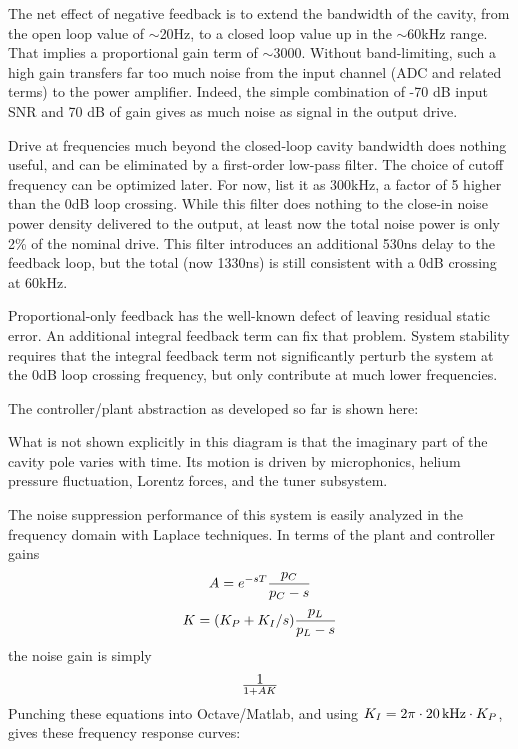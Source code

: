 The net effect of negative feedback is to extend the bandwidth of
the cavity, from the open loop value of $\sim$20\thinspace Hz, to a closed
loop value up in the $\sim$60\thinspace kHz range.  That implies a
proportional gain term of $\sim$3000.  Without band-limiting, such
a high gain transfers far too much noise from the input channel
(ADC and related terms) to the power amplifier.   Indeed, the simple
combination of -70 dB input SNR and 70 dB of gain gives as much noise
as signal in the output drive.

Drive at frequencies much beyond the closed-loop cavity bandwidth does
nothing useful, and can be eliminated by a first-order low-pass filter.
The choice of cutoff frequency can be optimized later.
For now, list it as 300\thinspace kHz, a factor of 5 higher
than the 0\thinspace dB loop crossing.  While this filter does nothing
to the close-in noise power density delivered to the output, at least
now the total noise power is only 2\% of the nominal drive.
This filter introduces an additional 530\thinspace ns delay to the
feedback loop, but the total (now 1330\thinspace ns) is still
consistent with a 0\thinspace dB crossing at 60\thinspace kHz.

Proportional-only feedback has the well-known defect of leaving
residual static error.  An additional integral feedback term can
fix that problem.  System stability requires that the integral feedback
term not significantly perturb the system at the 0\thinspace dB
loop crossing frequency, but only contribute at much lower frequencies.

\vfill\eject
The controller/plant abstraction as developed so far is shown here:


What is not shown explicitly in this diagram is that the imaginary part
of the cavity pole varies with time.  Its motion is driven by microphonics,
helium pressure fluctuation, Lorentz forces, and the tuner subsystem.

The noise suppression performance of this system is easily analyzed
in the frequency domain with Laplace techniques.
In terms of the plant and controller gains
$$A = e^{-sT}{p_C\over p_C-s}$$
$$K = (K_P + K_I/s){p_L\over p_L-s}$$
the noise gain is simply
$$1\over 1 + AK$$
\vfill\eject
Punching these equations into Octave/Matlab,
and using $K_I = 2\pi \cdot 20\thinspace {\rm kHz} \cdot K_P$,
gives these frequency response curves:


